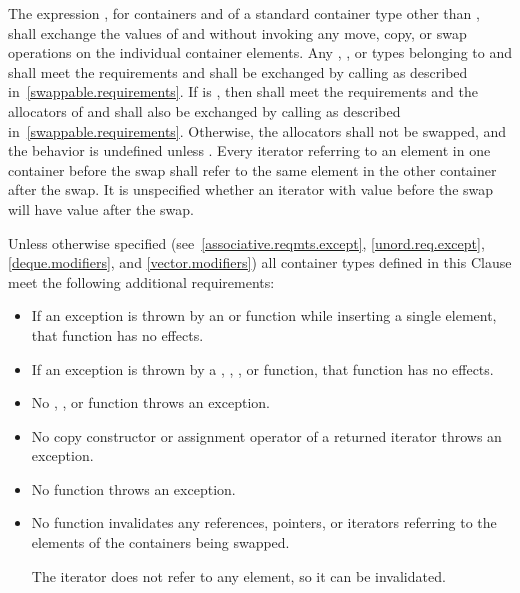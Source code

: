 \pnum
The expression , for containers  and  of a standard
container type other than , shall exchange the values of  and
 without invoking any move, copy, or swap operations on the individual
container elements.
Any , , or  types
belonging to  and  shall meet the  requirements
and shall be exchanged by calling 
as described in~\ref{swappable.requirements}. If
 is
, then
 shall meet the  requirements and
the allocators of  and  shall also be exchanged
by calling  as described in~\ref{swappable.requirements}.
Otherwise, the allocators shall not be swapped, and the behavior is
undefined unless . Every iterator
referring to an element in one container before the swap shall refer to the same
element in the other container after the swap. It is unspecified whether an iterator
with value  before the swap will have value  after the
swap.

\pnum
Unless otherwise specified (see~\ref{associative.reqmts.except}, \ref{unord.req.except}, \ref{deque.modifiers}, and
\ref{vector.modifiers})
all container types defined in this Clause meet
the following additional requirements:

\begin{itemize}
\item
If an exception is thrown by an
 or 
function while inserting a single element, that
function has no effects.
\item
If an exception is thrown by a
,
,
, or 
function, that function has no effects.
\item
No
,
,
or
function throws an exception.
\item
No copy constructor or assignment operator of a returned iterator
throws an exception.
\item
No
function throws an exception.
\item
No
function invalidates any references,
pointers, or iterators referring to the elements
of the containers being swapped.
\begin{note}
The  iterator does not refer to any element, so it can be invalidated.
\end{note}
\end{itemize}

